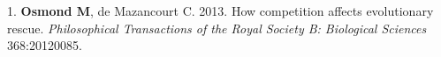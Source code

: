 \documentclass[12pt]{article}
\begin{document}
\noindent\hspace{.1cm}1. \textbf{Osmond M}, de Mazancourt C. 2013. How competition affects evolutionary rescue. \textit{Philosophical Transactions of the Royal Society B: Biological Sciences} 368:20120085. %

%


%
\end{document}
